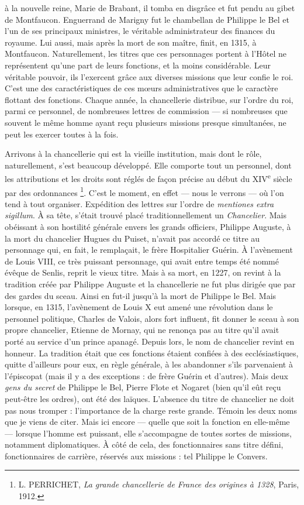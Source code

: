 \documentclass[french,twoside]{book} %
\begin{document}
\label{p38} à la nouvelle reine, Marie de Brabant, il tomba en disgrâce et fut pendu au gibet de Montfaucon. Enguerrand de Marigny fut le chambellan de Philippe le Bel et l’un de ses principaux ministres, le véritable administrateur des finances du royaume. Lui aussi, mais après la mort de son maître, finit, en 1315, à Montfaucon. Naturellement, les titres que ces personnages portent à l’Hôtel ne représentent qu’une part de leurs fonctions, et la moins considérable. Leur véritable pouvoir, ils l’exercent grâce aux diverses missions que leur confie le roi. C’est une des caractéristiques de ces mœurs administratives que le caractère flottant des fonctions. Chaque année, la chancellerie distribue, sur l’ordre du roi, parmi ce personnel, de nombreuses lettres de commission — si nombreuses que souvent le même homme ayant reçu plusieurs missions presque simultanées, ne peut les exercer toutes à la fois.\par
Arrivons à la chancellerie qui est la vieille institution, mais dont le rôle, naturellement, s’est beaucoup développé. Elle comporte tout un personnel, dont les attributions et les droits sont réglés de façon précise au début du XIV\textsuperscript{e} siècle par des ordonnances \footnote{ L. PERRICHET, {\itshape La grande chancellerie de France des origines à 1328}, Paris, 1912.}. C’est le moment, en effet — nous le verrons — où l’on tend à tout organiser. Expédition des lettres sur l’ordre de \emph{mentiones extra sigillum}. À sa tête, s’était trouvé placé traditionnellement un \emph{Chancelier}. Mais obéissant à son hostilité générale envers les grands officiers, Philippe Auguste, à la mort du chancelier Hugues du Puiset, n’avait pas accordé ce titre au personnage qui, en fait, le remplaçait, le frère Hospitalier Guérin. À l’avènement de Louis VIII, ce très puissant personnage, qui avait entre temps été nommé évêque de Senlis, reprit le vieux titre. Mais à sa mort, en 1227, on revint à la tradition créée par Philippe Auguste et la chancellerie ne fut plus dirigée que par des gardes du sceau. Ainsi en fut-il jusqu’à la mort de Philippe le Bel. Mais lorsque, en 1315, l’avènement de Louis X eut amené une révolution dans le personnel politique, Charles de Valois, alors fort influent, fit donner le sceau à son propre chancelier, Etienne de Mornay, qui ne renonça pas au titre qu’il avait porté au service d’un prince apanagé. Depuis lors, le nom de chancelier revint en honneur. La tradition était que ces fonctions étaient confiées à des ecclésiastiques, quitte d’ailleurs pour eux, en règle générale, à les abandonner s’ils parvenaient à l’épiscopat (mais il y a des exceptions : de frère Guérin et d’autres). Mais deux \emph{gens du secret} de Philippe le Bel, Pierre Flote et Nogaret (bien qu’il eût reçu peut-être les ordres), ont été des laïques. L’absence du titre de chancelier ne doit pas nous tromper : l’importance de la charge reste grande. Témoin les deux noms que je viens de citer. Mais ici encore — quelle que soit la fonction en elle-même — lorsque l’homme est puissant, elle s’accompagne de toutes sortes de missions, notamment diplomatiques. À côté de cela, des fonctionnaires sans titre défini, fonctionnaires de carrière, réservés aux missions : tel Philippe le Convers.\par
\end{document}
